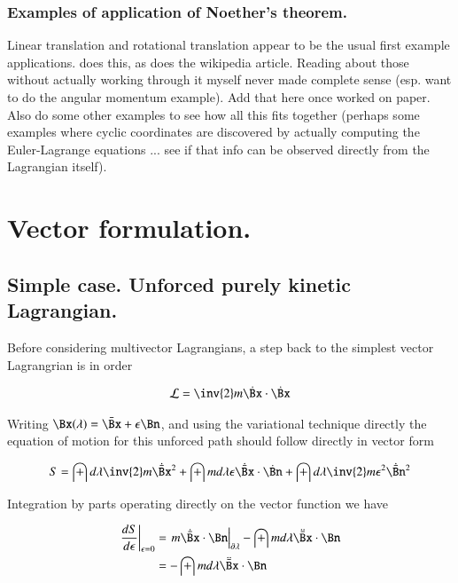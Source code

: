 \documentclass{article}
\begin{document}
\subsubsection{ Examples of application of Noether's theorem. }

Linear translation and rotational translation appear to be the usual first example
applications.  \cite{TongDynamics} does this, as does the wikipedia article.
Reading about those without actually working through it 
myself never made complete sense (esp. want to do the angular momentum
example).  Add that here once worked on paper.  Also do some other examples
to see how all this fits together (perhaps some examples where cyclic
coordinates are discovered by actually computing the Euler-Lagrange equations
... see if that info can be observed directly from the Lagrangian itself).

\section{ Vector formulation. }

\subsection{ Simple case.  Unforced purely kinetic Lagrangian. }

Before considering multivector Lagrangians, a step back to the simplest vector Lagrangrian is in order

\begin{align*}
\LL = \inv{2}m \dot{\Bx} \cdot \dot{\Bx}
\end{align*}

Writing $\Bx(\lambda) = \bar{\Bx} + \epsilon \Bn$, and using the variational technique directly the equation of motion for this unforced path should follow directly
in vector form

\begin{align*}
S = \int d\lambda \inv{2} m \dot{\bar{\Bx}}^2 + \int m d\lambda \epsilon \dot{\bar{\Bx}} \cdot \dot{\Bn} + \int d\lambda \inv{2} m \epsilon^2 \dot{\bar{\Bn}}^2
\end{align*}

Integration by parts operating directly on the vector function we have

\begin{align*}
\left.\frac{d S}{d\epsilon}\right\vert_{\epsilon=0} 
&= \left.{m \dot{\bar{\Bx}} \cdot {\Bn}}\right\vert_{\partial \lambda} - \int m d\lambda \ddot{\bar{\Bx}} \cdot {\Bn} \\
&= - \int m d\lambda \ddot{\bar{\Bx}} \cdot {\Bn} \\
\end{align*}
\end{document}
